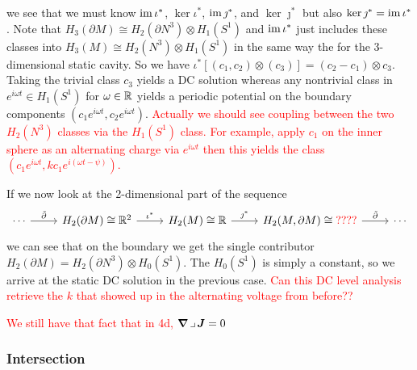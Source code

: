 \documentclass{article}
\begin{document}
we see that we must know $\operatorname{im} \iota^*$, $\ker \iota^*$, $\operatorname{im} \jmath^*$, and $\ker \jmath^*$ but also $\ker \jmath^* = \operatorname{im} \iota^*$. Note that $H_3(\partial M) \cong H_2(\partial N^3) \otimes H_1(S^1)$ and $\operatorname{im} \iota^*$ just includes these classes into $H_3(M) \cong H_2(N^3)\otimes H_1(S^1)$ in the same way the for the 3-dimensional static cavity. So we have $\iota^*[(c_1,c_2)\otimes (c_3)] = (c_2-c_1)\otimes c_3$. Taking the trivial class $c_3$ yields a DC solution whereas any nontrivial class in $e^{i \omega t} \in H_1(S^1)$ for $\omega \in \mathbb{R}$ yields a periodic potential on the boundary components $(c_1 e^{i\omega t}, c_2 e^{i\omega t})$. \textcolor{red}{Actually we should see coupling between the two $H_2(N^3)$ classes  via the $H_1(S^1)$ class. For example, apply $c_1$ on the inner sphere as an alternating charge via $e^{i\omega t}$ then this yields the class $\left(c_1 e^{i\omega t}, kc_1 e^{i(\omega t-\psi)}\right)$.}  

If we now look at the 2-dimensional part of the sequence
\[
\begin{tikzcd}
\cdots \arrow[r, "\tilde{\partial}"] & H_2(\partial M)\cong \mathbb{R}^2 \arrow[r, "\iota^*"]   & H_2(M) \cong \R \arrow[r, "\jmath^*"]         & {H_2(M,\partial M)\cong \textcolor{red}{????}} \arrow[r, "\tilde{\partial}"] & \cdots
\end{tikzcd}
\]
we can see that on the boundary we get the single contributor $H_2(\partial M) = H_2(\partial N^3)\otimes H_0(S^1)$. The $H_0(S^1)$ is simply a constant, so we arrive at the static DC solution in the previous case.  \textcolor{red}{Can this DC level analysis retrieve the $k$ that showed up in the alternating voltage from before??}

\textcolor{red}{We still have that fact that in 4d, $\boldsymbol{\nabla} \hspace*{.5mm}\lrcorner \hspace*{.5mm} \boldsymbol{J}=0$}

\subsubsection{Intersection}
\end{document}

